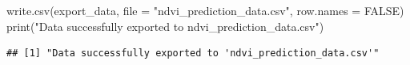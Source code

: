 \documentclass[
]{article}
\newenvironment{Shaded}{}{}
\newcommand{\AttributeTok}[1]{\textcolor[rgb]{0.49,0.56,0.16}{#1}}
\newcommand{\CommentTok}[1]{\textcolor[rgb]{0.38,0.63,0.69}{\textit{#1}}}
\newcommand{\ConstantTok}[1]{\textcolor[rgb]{0.53,0.00,0.00}{#1}}
\newcommand{\FunctionTok}[1]{\textcolor[rgb]{0.02,0.16,0.49}{#1}}
\newcommand{\NormalTok}[1]{#1}
\newcommand{\OtherTok}[1]{\textcolor[rgb]{0.00,0.44,0.13}{#1}}
\newcommand{\SpecialCharTok}[1]{\textcolor[rgb]{0.25,0.44,0.63}{#1}}
\newcommand{\StringTok}[1]{\textcolor[rgb]{0.25,0.44,0.63}{#1}}
\begin{document}
\begin{Shaded}
\begin{Highlighting}[]
\FunctionTok{write.csv}\NormalTok{(export\_data, }\AttributeTok{file =} \StringTok{"ndvi\_prediction\_data.csv"}\NormalTok{, }\AttributeTok{row.names =} \ConstantTok{FALSE}\NormalTok{)}
\FunctionTok{print}\NormalTok{(}\StringTok{"Data successfully exported to \textquotesingle{}ndvi\_prediction\_data.csv\textquotesingle{}"}\NormalTok{)}
\end{Highlighting}
\end{Shaded}

\begin{verbatim}
## [1] "Data successfully exported to 'ndvi_prediction_data.csv'"
\end{verbatim}

\begin{Shaded}
\end{Shaded}
\end{document}
